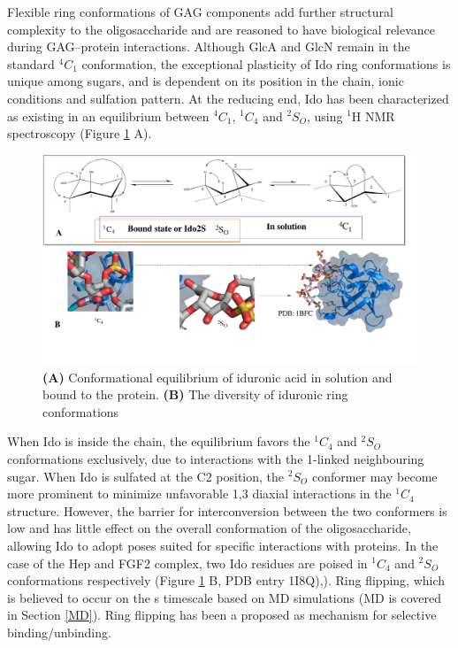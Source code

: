 \documentclass[journal=jctcce,manuscript=article]{achemso}
\begin{document}
{Flexible ring conformations of \ac{GAG} components add further structural complexity to the oligosaccharide and are reasoned to have biological relevance during \ac{GAG}--protein interactions.\cite{Sattelle2013DoesHeparanome} 
Although \ac{GlcA} and \ac{GlcN} remain in the standard $^{4}C_{1}$ conformation, the exceptional plasticity of \ac{Ido} ring conformations is unique among sugars, and is dependent on its position in the chain, ionic conditions and sulfation pattern.\cite{Capila2002Heparin-proteinInteractions., vanBoeckel1987ConformationalAcid}
At the reducing end, \ac{Ido} has been characterized as existing in an equilibrium between $^{4}C_{1}$, $^{1}C_{4}$ and $^{2}S_{O}$, using $^{1}$H NMR spectroscopy (Figure \ref{fig:ido_confs} A).\cite{Ferro1986EvidenceStudies, vanBoeckel1987ConformationalAcid} 
\begin{figure}[tl!]
\includegraphics[width=12cm]{ido_confs.pdf}
\caption{\textbf{(A)} Conformational equilibrium of iduronic acid in solution and bound to the protein. \textbf{(B)} The diversity of iduronic ring conformations }
\label{fig:ido_confs}
\end{figure}
When \ac{Ido} is inside the chain, the equilibrium favors the $^{1}C_{4}$ and $^{2}S_{O}$ conformations exclusively, due to interactions with the 1-linked neighbouring sugar.\cite{vanBoeckel1987ConformationalAcid} 
When \ac{Ido} is sulfated at the C2 position, the $^{2}S_{O}$ conformer may become more prominent to minimize unfavorable 1,3 diaxial interactions in the $^{1}C_{4}$ structure.\cite{Hsieh2016UncoveringSulphateb} However, the barrier for interconversion between the two conformers is low and has little effect on the overall conformation of the oligosaccharide, allowing \ac{Ido} to adopt poses suited for specific interactions with proteins. \cite{Capila2002Heparin-proteinInteractions., Woods2018PredictingComplexes} 
In the case of the \ac{Hep} and \ac{FGF2} complex, two \ac{Ido} residues are poised in $^{1}C_{4}$ and $^{2}S_{O}$ conformations respectively (Figure \ref{fig:ido_confs} B, \ac{PDB} entry 1I8Q),).\cite{Faham1996HeparinFactor} 
Ring flipping, which is believed to occur on the \textmu s timescale based on \ac{MD} simulations (\ac{MD} is covered in Section 
\ref{MD}).\cite{Sattelle2012DependenceIdopyranosides} 
Ring flipping has been a proposed as mechanism for selective binding/unbinding.\cite{Faham1996HeparinFactor} 

}
\end{document}
